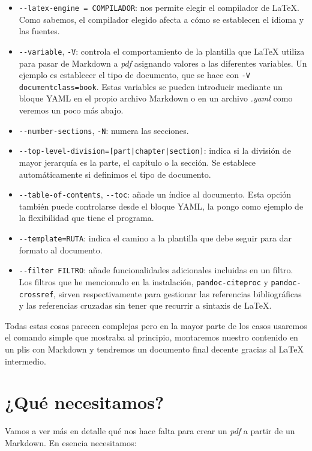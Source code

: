 \begin{itemize}
\item
  \lstinline!--latex-engine = COMPILADOR!: nos permite elegir el
  compilador de LaTeX. Como sabemos, el compilador elegido afecta a cómo
  se establecen el idioma y las fuentes.
\item
  \lstinline!--variable!, \lstinline!-V!: controla el comportamiento de
  la plantilla que LaTeX utiliza para pasar de Markdown a \emph{pdf}
  asignando valores a las diferentes variables. Un ejemplo es establecer
  el tipo de documento, que se hace con
  \lstinline!-V documentclass=book!. Estas variables se pueden
  introducir mediante un bloque YAML en el propio archivo Markdown o en
  un archivo \emph{.yaml} como veremos un poco más abajo.
\item
  \lstinline!--number-sections!, \lstinline!-N!: numera las secciones.
\item
  \lstinline!--top-level-division=[part|chapter|section]!: indica si la
  división de mayor jerarquía es la parte, el capítulo o la sección. Se
  establece automáticamente si definimos el tipo de documento.
\item
  \lstinline!--table-of-contents!, \lstinline!--toc!: añade un índice al
  documento. Esta opción también puede controlarse desde el bloque YAML,
  la pongo como ejemplo de la flexibilidad que tiene el programa.
\item
  \lstinline!--template=RUTA!: indica el camino a la plantilla que debe
  seguir para dar formato al documento.
\item
  \lstinline!--filter FILTRO!: añade funcionalidades adicionales
  incluidas en un filtro. Los filtros que he mencionado en la
  instalación, \lstinline!pandoc-citeproc! y
  \lstinline!pandoc-crossref!, sirven respectivamente para gestionar las
  referencias bibliográficas y las referencias cruzadas sin tener que
  recurrir a sintaxis de LaTeX.
\end{itemize}

Todas estas cosas parecen complejas pero en la mayor parte de los casos
usaremos el comando simple que mostraba al principio, montaremos nuestro
contenido en un plis con Markdown y tendremos un documento final decente
gracias al LaTeX intermedio.

\section{¿Qué necesitamos?}

Vamos a ver más en detalle qué nos hace falta para crear un \emph{pdf} a
partir de un Markdown. En esencia necesitamos:

